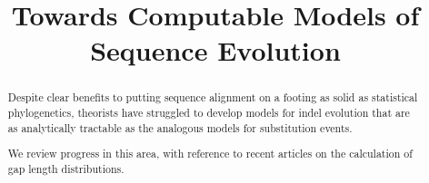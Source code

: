 \documentclass{bmcart}
\begin{document}
\begin{frontmatter}

\begin{fmbox}

\title{Towards Computable Models of Sequence Evolution}

\author[
   addressref={aff1},                   %
   corref={aff1},                       %
   email={ihh@berkeley.edu}   %
]{ }

\address[id=aff1]{%
  , %
  ,                              %
}


\end{fmbox}%

\begin{abstractbox}

\begin{abstract} %
Despite clear benefits to putting sequence alignment on a footing as solid as statistical phylogenetics,
theorists have struggled to develop models for indel evolution that are as analytically tractable
as the analogous models for substitution events.

We review progress in this area, with reference to
recent articles on the calculation of gap length distributions.
\end{abstract}

\begin{keyword}
\end{keyword}


\end{abstractbox}
%

\end{frontmatter}
\end{document}
